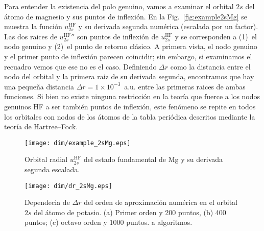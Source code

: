 Para entender la existencia del polo genuino, vamos a examinar el 
orbital $2s$ del átomo de magnesio y sus puntos de inflexión. En la 
Fig.~\ref{fig:example2sMg} se muestra la función $u_{2s}^{\mathrm{HF}}$ 
y su derivada segunda numérica (escalada por un factor). Las dos raices 
de $u_{2s}^{\mathrm{HF}}''$ son puntos de inflexión de 
$u_{2s}^{\mathrm{HF}}$ y se corresponden a (1)~el nodo genuino y (2)~el 
punto de retorno clásico. A primera vista, el nodo genuino y el primer 
punto de inflexión parecen coincidir; sin embargo, si examinamos el 
recuadro vemos que ese no es el caso. Definiendo $\Delta r$ como la 
distancia entre el nodo del orbital y la primera raiz de su derivada 
segunda, encontramos que hay una pequeña distancia 
$\Delta r=1\times 10^{-3}$~a.u. entre las primeras raices de ambas 
funciones. Si bien no existe ninguna restricción en la teoría que fuerce 
a los nodos genuinos HF a ser también puntos de inflexión, este fenómeno 
se repite en todos los orbitales con nodos de los átomos de la tabla 
periódica descritos mediante la teoría de Hartree--Fock. 

\begin{figure}
\vspace{-0.4cm}
\centering
\texttt{[image: dim/example\_2sMg.eps]} 
\vspace{-0.45cm}
\caption[Orbital radial y su derivada segunda.]
{Orbital radial $u_{2s}^{\mathrm{HF}}$ del estado fundamental de Mg y su 
derivada segunda escalada.}
\label{fig:example2sMg}

\vspace{0.4cm}
\texttt{[image: dim/dr\_2sMg.eps]} 
\vspace{-0.45cm}
\caption[Dependecia de $\Delta r$ del orden de aproximación numérica.]
{Dependecia de $\Delta r$ del orden de aproximación numérica en el 
orbital $2s$ del átomo de potasio. (a) Primer orden y 200 puntos, (b) 
400 puntos; (c) octavo orden y 1000 puntos.
a algoritmos.}
\label{fig:dr2sMg}
\end{figure}

